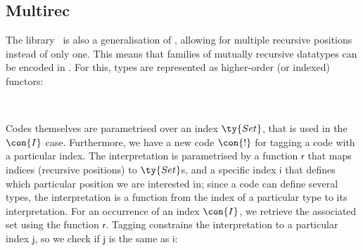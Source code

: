 \documentclass[submission,copyright,creativecommons,sharealike,noncommercial]{eptcs}
\newcommand{\Conid}[1]{\mathit{#1}}
\newcommand{\Varid}[1]{\mathit{#1}}
\def\resethooks{\global\let\SaveRestoreHook\empty
  \global\let\ColumnHook\empty}
\let\hspost\empty
\renewcommand\Varid[1]{\mathord{\textsf{#1}}}
\let\Conid\Varid
\begin{document}
\subsection{Multirec}


The \multirec library~\cite{multirec} is also a generalisation of \regular,
allowing for multiple recursive positions instead of only one. This means that
families of mutually recursive datatypes can be encoded in \multirec. For this,
types are represented as higher-order (or indexed) functors:

\begin{hscode}\SaveRestoreHook
\column{B}{@{}>{\hspre}l<{\hspost}@{}}\column{3}{@{}>{\hspre}l<{\hspost}@{}}\column{E}{@{}>{\hspre}l<{\hspost}@{}}\>[3]{}\;\mathbin{:}\;\;\Varid{→}\;\<[E]\\
\>[3]{}\;\Conid{I}\;\mathrel{=}\;\Conid{I}\;\Varid{→}\;\<[E]\ColumnHook
\end{hscode}\resethooks

Codes themselves are parametrised over an index \ensuremath{\ty{Set}}, that is
used in the \ensuremath{\con{I}} case. Furthermore, we have a new code
\ensuremath{\con{!}} for tagging a code with a particular index. The interpretation is
parametrised by a function \ensuremath{\Varid{r}} that maps indices (recursive positions) to
\ensuremath{\ty{Set}}s, and a specific index \ensuremath{\Varid{i}} that defines which particular position we are
interested in; since a code can define several types, the interpretation is a
function from the index of a particular type to its interpretation.
For an occurrence of an index \ensuremath{\con{I}}, we retrieve the associated set using the
function \ensuremath{\Varid{r}}. Tagging constrains the interpretation to a particular index \ensuremath{\Varid{j}},
so we check if \ensuremath{\Varid{j}} is the same as \ensuremath{\Varid{i}}:
\end{document}
